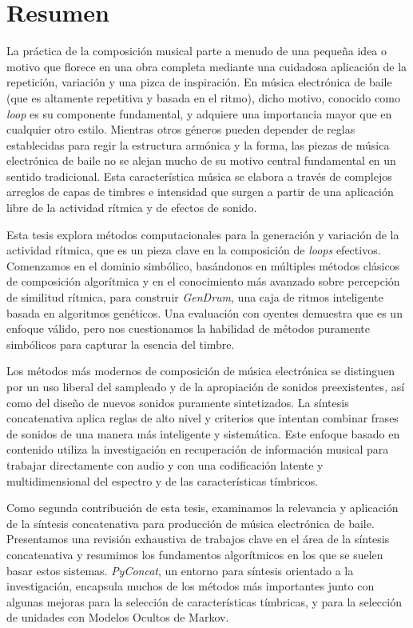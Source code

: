 
\chapter{Resumen}

La práctica de la composición musical parte a menudo de una pequeña idea o motivo que florece en una obra completa mediante una cuidadosa aplicación de la repetición, variación y una pizca de inspiración. En música electrónica de baile (que es altamente repetitiva y basada en el ritmo), dicho motivo, conocido como \textit {loop} es su componente fundamental, y adquiere una importancia mayor que en cualquier otro estilo. Mientras otros géneros pueden depender de reglas establecidas para regir la estructura armónica y la forma, las piezas de música electrónica de baile no se alejan mucho de su motivo central fundamental en un sentido tradicional. Esta característica música se elabora a través de complejos arreglos de capas de timbres e intensidad que surgen a partir de una aplicación libre de la actividad rítmica y de efectos de sonido.

Esta tesis explora métodos computacionales para la generación y variación de la actividad rítmica, que es un pieza clave en la composición de \textit{loops} efectivos. Comenzamos en el dominio simbólico, basándonos en múltiples métodos clásicos de composición algorítmica y en el conocimiento más avanzado sobre percepción de similitud rítmica, para construir \textit{GenDrum}, una caja de ritmos inteligente basada en algoritmos genéticos. Una evaluación con oyentes demuestra que es un enfoque válido, pero nos cuestionamos la habilidad de métodos puramente simbólicos para capturar la esencia del timbre.

Los métodos más modernos de composición de música electrónica se distinguen por un uso liberal del sampleado y de la apropiación de sonidos preexistentes, así como del diseño de nuevos sonidos puramente sintetizados. La síntesis concatenativa aplica reglas de alto nivel y criterios que intentan combinar frases de sonidos de una manera más inteligente y sistemática. Este enfoque basado en contenido utiliza la investigación en recuperación de información musical para trabajar directamente con audio y con una codificación latente y multidimensional del espectro y de las características tímbricos.

Como segunda contribución de esta tesis, examinamos la relevancia y aplicación de la síntesis concatenativa para producción de música electrónica de baile. Presentamos una revisión exhaustiva de trabajos clave en el área de la síntesis concatenativa y resumimos los fundamentos algorítmicos en los que se suelen basar estos sistemas. \textit {PyConcat}, un entorno para síntesis orientado a la investigación, encapsula muchos de los métodos más importantes junto con algunas mejoras para la selección de características tímbricas, y para la selección de unidades con Modelos Ocultos de Markov.

